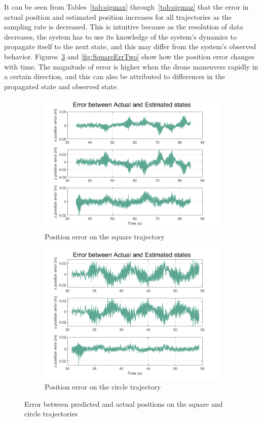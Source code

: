 \documentclass[letterpaper, paper,11pt]{AAS}	%
\begin{document}
It can be seen from Tables~\ref{tab:sigmax} through~\ref{tab:sigmaz} that the error in actual position and estimated position increases for all trajectories as the sampling rate is decreased. This is intuitive because as the resolution of data decreases, the system has to use its knowledge of the system's dynamics to propagate itself to the next state, and this may differ from the system's observed behavior. Figures~\ref{fig:SquareErr} and \ref{fig:SquareErrTwo} show how the position error changes with time. The magnitude of error is higher when the drone maneuvers rapidly in a certain direction, and this can also be attributed to differences in the propagated state and observed state.

\begin{figure}[H]
\centering
\begin{subfigure}{.5\textwidth}
	\centering
	\includegraphics[width=\textwidth]{Figures/square1_err}
	\caption{Position error on the square trajectory}
	\label{fig:SquareErr1}
\end{subfigure}%
\begin{subfigure}{.5\textwidth}
	\centering
	\includegraphics[width=\textwidth]{Figures/circle1_err}
	\caption{Position error on the circle trajectory}
	\label{fig:SquareErr2}
\end{subfigure}
\caption{Error between predicted and actual positions on the square and circle trajectories}
\label{fig:SquareErr}
\end{figure}
\end{document}
